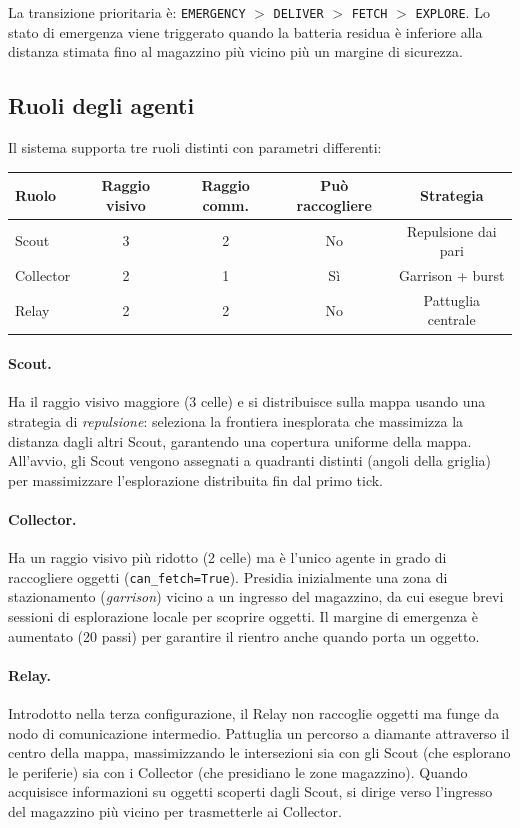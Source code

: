 La transizione prioritaria è: \texttt{EMERGENCY} $>$ \texttt{DELIVER} $>$ \texttt{FETCH} $>$ \texttt{EXPLORE}. Lo stato di emergenza viene triggerato quando la batteria residua è inferiore alla distanza stimata fino al magazzino più vicino più un margine di sicurezza.

\subsection{Ruoli degli agenti}

Il sistema supporta tre ruoli distinti con parametri differenti:

\begin{center}
\begin{tabular}{lcccc}
\toprule
\textbf{Ruolo} & \textbf{Raggio visivo} & \textbf{Raggio comm.} & \textbf{Può raccogliere} & \textbf{Strategia} \\
\midrule
Scout     & 3 & 2 & No  & Repulsione dai pari \\
Collector & 2 & 1 & Sì  & Garrison + burst \\
Relay     & 2 & 2 & No  & Pattuglia centrale \\
\bottomrule
\end{tabular}
\end{center}

\paragraph{Scout.} Ha il raggio visivo maggiore (3 celle) e si distribuisce sulla mappa usando una strategia di \emph{repulsione}: seleziona la frontiera inesplorata che massimizza la distanza dagli altri Scout, garantendo una copertura uniforme della mappa. All'avvio, gli Scout vengono assegnati a quadranti distinti (angoli della griglia) per massimizzare l'esplorazione distribuita fin dal primo tick.

\paragraph{Collector.} Ha un raggio visivo più ridotto (2 celle) ma è l'unico agente in grado di raccogliere oggetti (\texttt{can\_fetch=True}). Presidia inizialmente una zona di stazionamento (\emph{garrison}) vicino a un ingresso del magazzino, da cui esegue brevi sessioni di esplorazione locale per scoprire oggetti. Il margine di emergenza è aumentato (20 passi) per garantire il rientro anche quando porta un oggetto.

\paragraph{Relay.} Introdotto nella terza configurazione, il Relay non raccoglie oggetti ma funge da nodo di comunicazione intermedio. Pattuglia un percorso a diamante attraverso il centro della mappa, massimizzando le intersezioni sia con gli Scout (che esplorano le periferie) sia con i Collector (che presidiano le zone magazzino). Quando acquisisce informazioni su oggetti scoperti dagli Scout, si dirige verso l'ingresso del magazzino più vicino per trasmetterle ai Collector.

